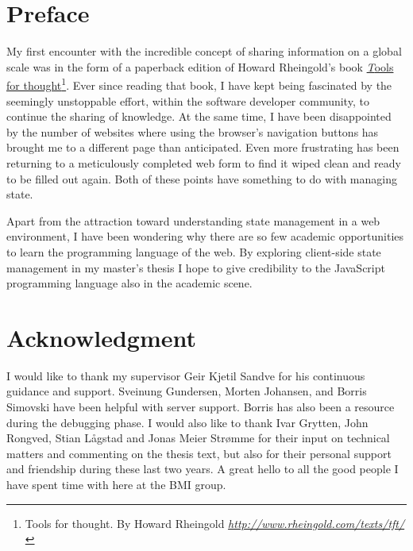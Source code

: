 \documentclass[english]{ifimaster}
\begin{document}




 
\chapter*{Preface}
My first encounter with the incredible concept of sharing information on a global scale was in the form of a paperback edition of Howard Rheingold's book \href{http://www.rheingold.com/texts/tft/}{\textit Tools for thought}\footnote{Tools for thought. By Howard Rheingold \href{http://www.rheingold.com/texts/tft/}{\textit{http://www.rheingold.com/texts/tft/}}}. Ever since reading that book, I have kept being fascinated by the seemingly unstoppable effort, within the software developer community, to continue the sharing of knowledge. At the same time, I have been disappointed by the number of websites where using the browser's navigation buttons has brought me to a different page than anticipated. Even more frustrating has been returning to a meticulously completed web form to find it wiped clean and ready to be filled out again. Both of these points have something to do with managing state.

Apart from the attraction toward understanding state management in a web environment, I have been wondering why there are so few academic opportunities to learn the programming language of the web. By exploring client-side state management in my master's thesis I hope to give credibility to the JavaScript programming language also in the academic scene.



\chapter*{Acknowledgment}
I would like to thank my supervisor Geir Kjetil Sandve for his continuous guidance and support. Sveinung Gundersen, Morten Johansen, and Borris Simovski have been helpful with server support. Borris has also been a resource during the debugging phase. I would also like to thank Ivar Grytten, John Rongved, Stian Lågstad and Jonas Meier Strømme for their input on technical matters and commenting on the thesis text, but also for their personal support and friendship during these last two years. A great hello to all the good people I have spent time with here at the BMI group.
\end{document}
